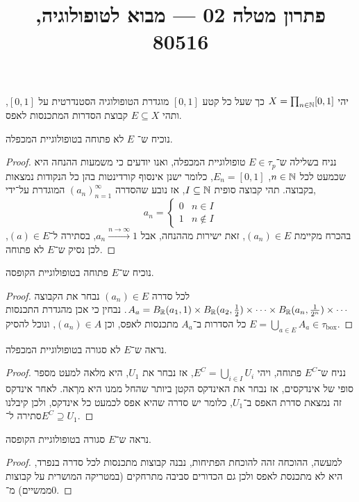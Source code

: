
\title{פתרון מטלה 02 --- מבוא לטופולוגיה, 80516}


\maketitle
\maketitleprint{}

\question{}
יהי $X = \prod_{n \in \mathbb{N}} [0, 1]$ כך שעל כל קטע $[0, 1]$ מוגדרת הטופולוגיה הסטנדרטית על $[0, 1]$, ותהי $E \subseteq X$ קבוצת הסדרות המתכנסות לאפס.

\subquestion{}
נוכיח ש־ $E$ לא פתוחה בטופולוגיית המכפלה.
\begin{proof}
	נניח בשלילה ש־$E \in \tau_p$ טופולוגיית המכפלה, ואנו יודעים כי משמעות ההנחה היא שכמעט לכל $n \in \mathbb{N}$, $E_n = [0, 1]$, כלומר ישנן אינסוף קורדינטות בהן כל הנקודות נמצאות בקבוצה.
	תהי קבוצה סופית $I \subseteq \mathbb{N}$, אז נובע שהסדרה ${(a_n)}_{n = 1}^\infty$ המוגדרת על־ידי,
	\[
		a_n
		= \begin{cases}
			0 & n \in I \\
			1 & n \notin I
		\end{cases}
	\]
	בהכרח מקיימת $(a_n) \in E$, זאת ישירות מההנחה, אבל $a_n \xrightarrow{n \to \infty} 1$, בסתירה ל־$(a) \in E$, לכן נסיק ש־$E$ לא פתוחה.
\end{proof}

נוכיח ש־$E$ פתוחה בטופולוגיית הקופסה.
\begin{proof}
	לכל סדרה $(a_n) \in E$ נבחר את הקבוצה $A_a = B_{\mathbb{R}}(a_1, 1) \times B_{\mathbb{R}}(a_2, \frac{1}{2}) \times \cdots \times B_{\mathbb{R}}(a_n, \frac{1}{2^n}) \times \cdots$.
	נבחין כי אכן מהגדרת התכנסות כל הסדרות ב־$A_a$ מתכנסות לאפס, וכן $(a_n) \in A$, ונוכל להסיק $E = \bigcup_{a \in E} A_a \in \tau_{\operatorname{box} }$.
\end{proof}

\subquestion{}
נראה ש־$E$ לא סגורה בטופולוגיית המכפלה.
\begin{proof}
	נניח ש־$E^C$ פתוחה, ויהי $E^C = \bigcup_{i \in I} U_i$, אז נבחר את $U_1$, היא מלאה למעט מספר סופי של אינדקסים, אז נבחר את האינדקס הקטן ביותר שהחל ממנו היא מךאה.
	לאחר אינדקס זה נמצאת סדרת האפס ב־$U_1$, כלומר יש סדרה שהיא אפס לכמעט כל אינדקס, ולכן קיבלנו סתירה ל־$E^C \supseteq U_1$.
\end{proof}
נראה ש־$E$ סגורה בטופולוגיית הקופסה.
\begin{proof}
	למעשה, ההוכחה זהה להוכחת הפתיחות, נבנה קבוצות מתכנסות לכל סדרה בנפרד, היא לא מתכנסת לאפס ולכן גם הכדורים סביבה מתרחקים (במטריקה המושרית על קבוצות ממשיים) מ־$0$.
\end{proof}

